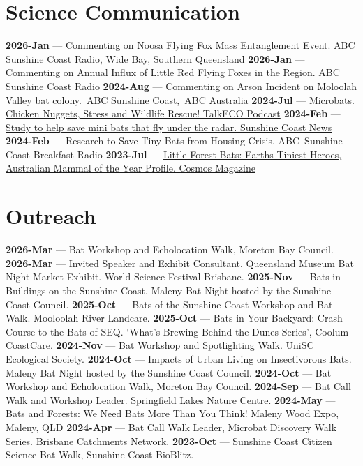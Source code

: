 \documentclass[
]{article}
\begin{document}
\section{Science Communication}\label{science-communication}

\textbf{2026-Jan} --- Commenting on Noosa Flying Fox Mass Entanglement
Event. ABC Sunshine Coast Radio, Wide Bay, Southern Queensland
\textbf{2026-Jan} --- Commenting on Annual Influx of Little Red Flying
Foxes in the Region. ABC Sunshine Coast Radio \textbf{2024-Aug} ---
\href{https://www.abc.net.au/news/2024-08-28/arsonists-kill-48-little-bent-winged-bats-sunshine-coast/104278398}{Commenting
on Arson Incident on Moloolah Valley bat colony.~ABC Sunshine Coast,~ABC
Australia} \textbf{2024-Jul} ---
\href{https://open.spotify.com/episode/2CKIDzUEnoRh8V33f3JMRy?si=SQ1X5U1rS2q_-QFs9SOf9w}{Microbats.
Chicken Nuggets, Stress and Wildlife Rescue! TalkECO Podcast}
\textbf{2024-Feb} ---
\href{https://www.sunshinecoastnews.com.au/2024/02/23/study-to-help-save-tiny-bats-that-fly-under-the-radar/}{Study
to help save mini bats that fly under the radar. Sunshine Coast News}
\textbf{2024-Feb} --- Research to Save Tiny Bats from Housing Crisis.
ABC~Sunshine Coast Breakfast Radio \textbf{2023-Jul} ---
\href{https://cosmosmagazine.com/nature/amoty/little-forest-bats-earths-tiniest-heroes/}{Little
Forest Bats: Earths Tiniest Heroes, Australian Mammal of the Year
Profile. Cosmos Magazine}

\section{Outreach}\label{outreach}

\textbf{2026-Mar} --- Bat Workshop and Echolocation Walk, Moreton Bay
Council. \textbf{2026-Mar} --- Invited Speaker and Exhibit Consultant.
Queensland Museum Bat Night Market Exhibit. World Science Festival
Brisbane. \textbf{2025-Nov} --- Bats in Buildings on the Sunshine Coast.
Maleny Bat Night hosted by the Sunshine Coast Council. \textbf{2025-Oct}
--- Bats of the Sunshine Coast Workshop and Bat Walk. Mooloolah River
Landcare. \textbf{2025-Oct} --- Bats in Your Backyard: Crash Course to
the Bats of SEQ. `What's Brewing Behind the Dunes Series', Coolum
CoastCare. \textbf{2024-Nov} --- Bat Workshop and Spotlighting Walk.
UniSC Ecological Society. \textbf{2024-Oct} --- Impacts of Urban Living
on Insectivorous Bats. Maleny Bat Night hosted by the Sunshine Coast
Council. \textbf{2024-Oct} --- Bat Workshop and Echolocation Walk,
Moreton Bay Council. \textbf{2024-Sep} --- Bat Call Walk and Workshop
Leader. Springfield Lakes Nature Centre. \textbf{2024-May} --- Bats and
Forests: We Need Bats More Than You Think! Maleny Wood Expo, Maleny, QLD
\textbf{2024-Apr} --- Bat Call Walk Leader, Microbat Discovery Walk
Series. Brisbane Catchments Network. \textbf{2023-Oct} --- Sunshine
Coast Citizen Science Bat Walk, Sunshine Coast BioBlitz.
\end{document}
